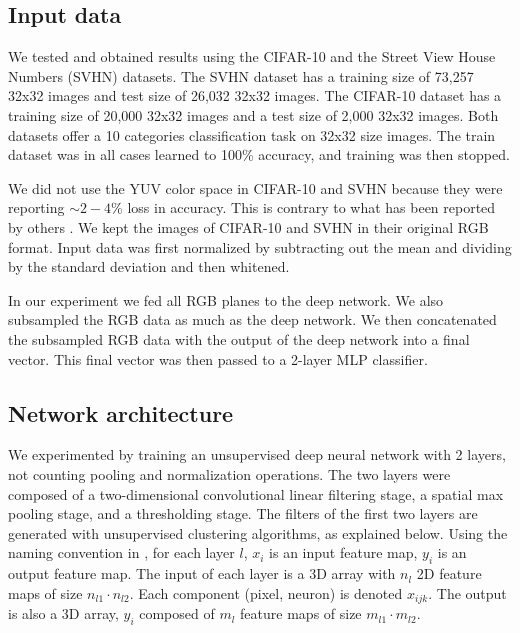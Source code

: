 \documentclass{article} %
\begin{document}
\subsection{Input data}

We tested and obtained results using the CIFAR-10 \cite{krizhevsky_learning_2009} and the Street View House Numbers (SVHN) \cite{netzer_reading_2011} datasets.
The SVHN dataset has a training size of 73,257 32x32 images and test size of 26,032 32x32 images.
The CIFAR-10 dataset has a training size of 20,000 32x32 images and a test size of 2,000 32x32 images.
Both datasets offer a 10 categories classification task on 32x32 size images.
The train dataset was in all cases learned to 100\% accuracy, and training was then stopped. 

We did not use the YUV color space in CIFAR-10 and SVHN because they were reporting $\sim 2-4\%$ loss in accuracy.
This is contrary to what has been reported by others \cite{jarrett_what_2009}.
We kept the images of CIFAR-10 and SVHN in their original RGB format.
Input data was first normalized by subtracting out the mean and dividing by the standard deviation and then whitened.

In our experiment we fed all RGB planes to the deep network.
We also subsampled the RGB data as much as the deep network.
We then concatenated the subsampled RGB data with the output of the deep network into a final vector.
This final vector was then passed to a 2-layer MLP classifier.

\subsection{Network architecture}
\label{sec-net-arch}

We experimented by training an unsupervised deep neural network with 2 layers, not counting pooling and normalization operations.
The two layers were composed of a two-dimensional convolutional linear filtering stage, a spatial max pooling stage, and a thresholding stage. 
The filters of the first two layers are generated with unsupervised clustering algorithms, as explained below. 
Using the naming convention in \cite{lecun_convolutional_2010}, for each layer $l$, $x_i$ is an input feature map, $y_i$ is an output feature map.
The input of each layer is a 3D array with $n_l$ 2D feature maps of size $n_{l1} \cdot n_{l2}$.
Each component (pixel, neuron) is denoted $x_{ijk}$. The output is also a 3D array, $y_i$ composed of $m_l$ feature maps of size $m_{l1} \cdot m_{l2}$.
\end{document}
